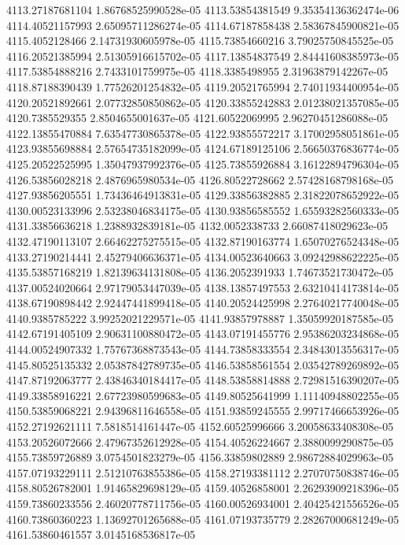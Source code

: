 {4113.27187681104 1.86768525990528e-05
4113.53854381549 9.35354136362474e-06
4114.40521157993 2.65095711286274e-05
4114.67187858438 2.58367845900821e-05
4115.4052128466 2.14731930605978e-05
4115.73854660216 3.79025750845525e-05
4116.20521385994 2.51305916615702e-05
4117.13854837549 2.84441608385973e-05
4117.53854888216 2.7433101759975e-05
4118.3385498955 2.31963879142267e-05
4118.87188390439 1.77526201254832e-05
4119.20521765994 2.74011934400954e-05
4120.20521892661 2.07732850850862e-05
4120.33855242883 2.01238021357085e-05
4120.7385529355 2.8504655001637e-05
4121.60522069995 2.96270451286088e-05
4122.13855470884 7.63547730865378e-05
4122.93855572217 3.17002958051861e-05
4123.93855698884 2.57654735182099e-05
4124.67189125106 2.56650376836774e-05
4125.20522525995 1.35047937992376e-05
4125.73855926884 3.16122894796304e-05
4126.53856028218 2.4876965980534e-05
4126.80522728662 2.57428168798168e-05
4127.93856205551 1.73436464913831e-05
4129.33856382885 2.31822078652922e-05
4130.00523133996 2.53238046834175e-05
4130.93856585552 1.65593282560333e-05
4131.33856636218 1.2388932839181e-05
4132.0052338733 2.66087418029623e-05
4132.47190113107 2.66462275275515e-05
4132.87190163774 1.65070276524348e-05
4133.27190214441 2.45279406636371e-05
4134.00523640663 3.09242988622225e-05
4135.53857168219 1.82139634131808e-05
4136.2052391933 1.74673521730472e-05
4137.00524020664 2.97179053447039e-05
4138.13857497553 2.63210414173814e-05
4138.67190898442 2.92447441899418e-05
4140.20524425998 2.27640217740048e-05
4140.9385785222 3.99252021229571e-05
4141.93857978887 1.35059920187585e-05
4142.67191405109 2.90631100880472e-05
4143.07191455776 2.95386203234868e-05
4144.00524907332 1.75767368873543e-05
4144.73858333554 2.34843013556317e-05
4145.80525135332 2.05387842789735e-05
4146.53858561554 2.03542789269892e-05
4147.87192063777 2.43846340184417e-05
4148.53858814888 2.72981516390207e-05
4149.33858916221 2.67723980599683e-05
4149.80525641999 1.11140948802255e-05
4150.53859068221 2.94396811646558e-05
4151.93859245555 2.99717466653926e-05
4152.27192621111 7.5818514161447e-05
4152.60525996666 3.20058633408308e-05
4153.20526072666 2.47967352612928e-05
4154.40526224667 2.3880099290875e-05
4155.73859726889 3.0754501823279e-05
4156.33859802889 2.98672884029963e-05
4157.07193229111 2.51210763855386e-05
4158.27193381112 2.27070750838746e-05
4158.80526782001 1.91465829698129e-05
4159.40526858001 2.26293909218396e-05
4159.73860233556 2.46020778711756e-05
4160.00526934001 2.40425421556526e-05
4160.73860360223 1.13692701265688e-05
4161.07193735779 2.28267000681249e-05
4161.53860461557 3.0145168536817e-05
}
